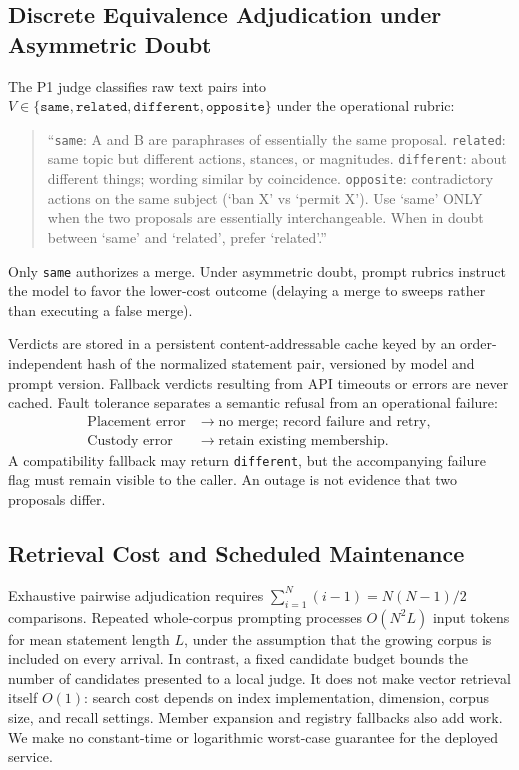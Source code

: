 \documentclass[11pt,a4paper]{article}
\begin{document}
\subsection{Discrete Equivalence Adjudication under Asymmetric Doubt}

The P1 judge classifies raw text pairs into $V \in \{\texttt{same}, \texttt{related}, \texttt{different}, \texttt{opposite}\}$ under the operational rubric:

\begin{quote}
\small
``\texttt{same}: A and B are paraphrases of essentially the same proposal. \texttt{related}: same topic but different actions, stances, or magnitudes. \texttt{different}: about different things; wording similar by coincidence. \texttt{opposite}: contradictory actions on the same subject (`ban X' vs `permit X'). Use `same' ONLY when the two proposals are essentially interchangeable. When in doubt between `same' and `related', prefer `related'.''
\end{quote}

Only \texttt{same} authorizes a merge. Under asymmetric doubt, prompt rubrics instruct the model to favor the lower-cost outcome (delaying a merge to sweeps rather than executing a false merge).

Verdicts are stored in a persistent content-addressable cache keyed by an order-independent hash of the normalized statement pair, versioned by model and prompt version. Fallback verdicts resulting from API timeouts or errors are never cached. Fault tolerance separates a semantic refusal from an operational failure:
\begin{align}
\text{Placement error} &\longrightarrow \text{no merge; record failure and retry},\\
\text{Custody error} &\longrightarrow \text{retain existing membership}.
\end{align}
A compatibility fallback may return \texttt{different}, but the accompanying failure flag must remain visible to the caller. An outage is not evidence that two proposals differ.

\subsection{Retrieval Cost and Scheduled Maintenance}
Exhaustive pairwise adjudication requires $\sum_{i=1}^{N}(i-1)=N(N-1)/2$ comparisons. Repeated whole-corpus prompting processes $O(N^2L)$ input tokens for mean statement length $L$, under the assumption that the growing corpus is included on every arrival. In contrast, a fixed candidate budget bounds the number of candidates presented to a local judge. It does not make vector retrieval itself $O(1)$: search cost depends on index implementation, dimension, corpus size, and recall settings. Member expansion and registry fallbacks also add work. We make no constant-time or logarithmic worst-case guarantee for the deployed service.
\end{document}
